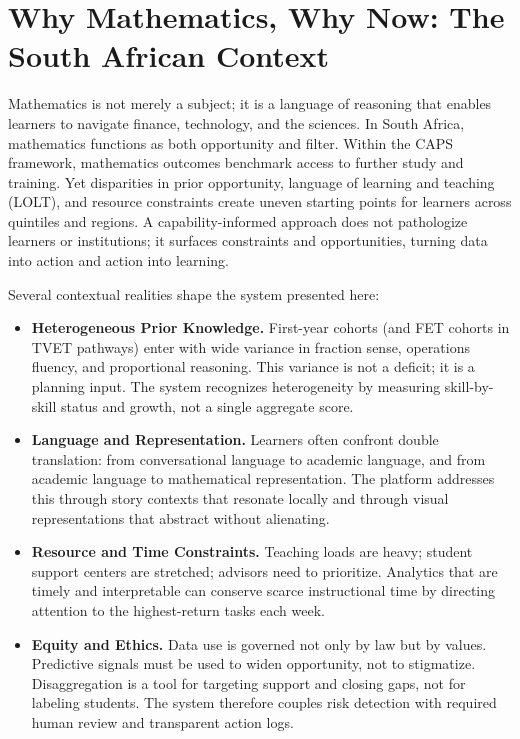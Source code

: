 \section{Why Mathematics, Why Now: The South African Context}

Mathematics is not merely a subject; it is a language of reasoning that enables learners to navigate finance, technology, and the sciences. In South Africa, mathematics functions as both opportunity and filter. Within the CAPS framework, mathematics outcomes benchmark access to further study and training. Yet disparities in prior opportunity, language of learning and teaching (LOLT), and resource constraints create uneven starting points for learners across quintiles and regions. A capability-informed approach does not pathologize learners or institutions; it surfaces constraints and opportunities, turning data into action and action into learning.

Several contextual realities shape the system presented here:

\begin{itemize}
  \item \textbf{Heterogeneous Prior Knowledge.} First-year cohorts (and FET cohorts in TVET pathways) enter with wide variance in fraction sense, operations fluency, and proportional reasoning. This variance is not a deficit; it is a planning input. The system recognizes heterogeneity by measuring skill-by-skill status and growth, not a single aggregate score.
  \item \textbf{Language and Representation.} Learners often confront double translation: from conversational language to academic language, and from academic language to mathematical representation. The platform addresses this through story contexts that resonate locally and through visual representations that abstract without alienating.
  \item \textbf{Resource and Time Constraints.} Teaching loads are heavy; student support centers are stretched; advisors need to prioritize. Analytics that are timely and interpretable can conserve scarce instructional time by directing attention to the highest-return tasks each week.
  \item \textbf{Equity and Ethics.} Data use is governed not only by law but by values. Predictive signals must be used to widen opportunity, not to stigmatize. Disaggregation is a tool for targeting support and closing gaps, not for labeling students. The system therefore couples risk detection with required human review and transparent action logs.
\end{itemize}

